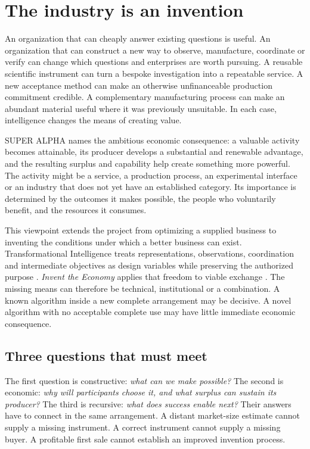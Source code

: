 \documentclass[11pt,letterpaper]{article}
\begin{document}
\clearpage
\section{The industry is an invention}
An organization that can cheaply answer existing questions is useful. An organization that can construct a new way to observe, manufacture, coordinate or verify can change which questions and enterprises are worth pursuing. A reusable scientific instrument can turn a bespoke investigation into a repeatable service. A new acceptance method can make an otherwise unfinanceable production commitment credible. A complementary manufacturing process can make an abundant material useful where it was previously unsuitable. In each case, intelligence changes the means of creating value.

SUPER ALPHA names the ambitious economic consequence: a valuable activity becomes attainable, its producer develops a substantial and renewable advantage, and the resulting surplus and capability help create something more powerful. The activity might be a service, a production process, an experimental interface or an industry that does not yet have an established category. Its importance is determined by the outcomes it makes possible, the people who voluntarily benefit, and the resources it consumes.

This viewpoint extends the project from optimizing a supplied business to inventing the conditions under which a better business can exist. Transformational Intelligence treats representations, observations, coordination and intermediate objectives as design variables while preserving the authorized purpose \cite{ti,original}. \emph{Invent the Economy} applies that freedom to viable exchange \cite{economy}. The missing means can therefore be technical, institutional or a combination. A known algorithm inside a new complete arrangement may be decisive. A novel algorithm with no acceptable complete use may have little immediate economic consequence.

\subsection{Three questions that must meet}
The first question is constructive: \emph{what can we make possible?} The second is economic: \emph{why will participants choose it, and what surplus can sustain its producer?} The third is recursive: \emph{what does success enable next?} Their answers have to connect in the same arrangement. A distant market-size estimate cannot supply a missing instrument. A correct instrument cannot supply a missing buyer. A profitable first sale cannot establish an improved invention process.
\end{document}
